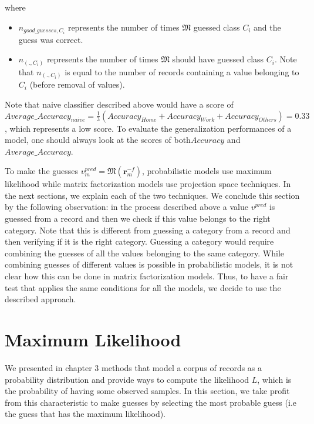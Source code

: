 where 
\begin{itemize} 
	\item $n_{good\_guesses,C_{i}}$  represents the number of times $\mathfrak{M}$ guessed class $C_{i}$ and the guess was correct.
	\item $n_{(.,C_{i})}$ represents the number of times $\mathfrak{M}$ should have guessed class $C_{i}$. Note that $n_{(.,C_{i})}$ is equal to the number of records containing a value belonging to $C_{i}$ (before removal of 				values).
\end{itemize}
Note that naive classifier described above would have a score of $Average\_Accuracy_{naive}=\frac{1}{3}(Accuracy_{Home}+Accuracy_{Work}+Accuracy_{Others})=0.33$, which represents a low score. To evaluate the generalization performances of a model, one should always look at the scores of both$Accuracy$ and $Average\_Accuracy$.\par

To make the guesses $v_{m}^{pred}=\mathfrak{M}(\mathbf{r}_{m}^{-f})$, probabilistic models use maximum likelihood while matrix factorization models use projection space techniques. In the next sections, we explain each of the two techniques. We conclude this section by the following observation: in the process described above a value $v^{pred}$ is guessed from a record and then we check if this value belongs to the right category. Note that this is different from guessing a category from a record and then verifying if it is the right category. Guessing a category would require combining the guesses of all the values belonging to the same category. While combining guesses of different values is possible in probabilistic models, it is not clear how this can be done in matrix factorization models. Thus, to have a fair test that applies the same conditions for all the models, we decide to use the described approach.

\section{Maximum Likelihood}

We presented in chapter 3 methods that model a corpus of records as a probability distribution and provide ways to compute the likelihood $\mathit{L}$, which is the probability of having some observed samples. In this section, we take profit from this characteristic to make guesses by selecting the most probable guess (i.e the guess that has the maximum likelihood). \par

